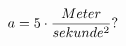 \documentclass[preview]{standalone}
\begin{document}
\begin{align*}
\special{dvisvgm:raw <g id='unique000'>}a = 5 \cdot \frac{Meter}{sekunde^{2}} ?\special{dvisvgm:raw </g>}
\end{align*}
\end{document}
